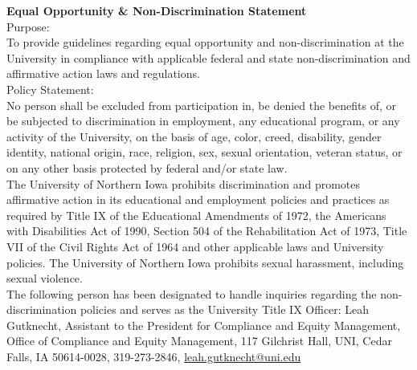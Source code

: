 \documentclass[12pt]{amsart}
\begin{document}
\noindent
\textbf{Equal Opportunity \& Non-Discrimination Statement}\\
\noindent
Purpose:\\
To provide guidelines regarding equal opportunity and non-discrimination at the University in compliance with applicable federal and state non-discrimination and affirmative action laws and regulations.\\

\noindent
Policy Statement:\\
No person shall be excluded from participation in, be denied the benefits of, or be subjected to discrimination in employment, any educational program, or any activity of the University, on the basis of age, color, creed, disability, gender identity, national origin, race, religion, sex, sexual orientation, veteran status, or on any other basis protected by federal and/or state law.\\

The University of Northern Iowa prohibits discrimination and promotes affirmative action in its educational and employment policies and practices as required by Title IX of the Educational Amendments of 1972, the Americans with Disabilities Act of 1990, Section 504 of the Rehabilitation Act of 1973, Title VII of the Civil Rights Act of 1964 and other applicable laws and University policies. The University of Northern Iowa prohibits sexual harassment, including sexual violence.\\

The following person has been designated to handle inquiries regarding the non-discrimination policies and serves as the University Title IX Officer: Leah Gutknecht, Assistant to the President for Compliance and Equity Management, Office of Compliance and Equity Management, 117 Gilchrist Hall, UNI, Cedar Falls, IA 50614-0028, 319-273-2846, \url{leah.gutknecht@uni.edu}
\end{document}
